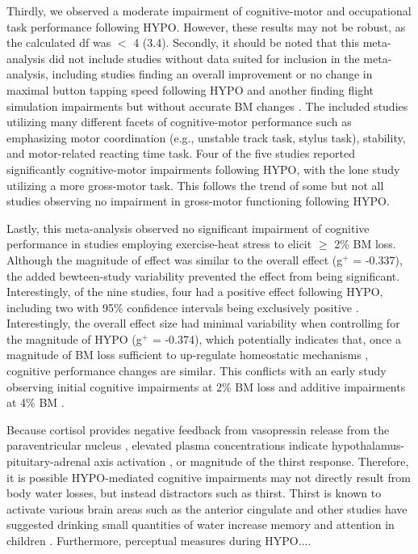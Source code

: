 Thirdly, we observed a moderate impairment of cognitive-motor and occupational task performance following HYPO. However, these results may not be robust, as the calculated df was ${<}$ 4 (3.4). Secondly, it should be noted that this meta-analysis did not include studies without data suited for inclusion in the meta-analysis, including studies finding an overall improvement \cite{bandelow_effects_2010} or no change \cite{hogervorst_cognitive_1996} in maximal button tapping speed following HYPO and another finding flight simulation impairments but without accurate BM changes \cite{lindseth_effects_2013}. The included studies utilizing many different facets of cognitive-motor performance such as emphasizing motor coordination (e.g., unstable track task, stylus task), stability, and motor-related reacting time task. Four of the five studies reported significantly cognitive-motor impairments following HYPO, with the lone study utilizing a more gross-motor task. This follows the trend of some \cite{savoie_effect_2015} but not all \cite{baker_progressive_2007} studies observing no impairment in gross-motor functioning following HYPO. 

Lastly, this meta-analysis observed no significant impairment of cognitive performance in studies employing exercise-heat stress to elicit ${\ge}$ 2\% BM loss. Although the magnitude of effect was similar to the overall effect (g${^+}$ = -0.337), the added bewteen-study variability prevented the effect from being significant. Interestingly, of the nine studies, four had a positive effect following HYPO, including two with 95\% confidence intervals being exclusively positive \cite{danci_voluntary_2009,bijlani_effect_1980}. Interestingly, the overall effect size had minimal variability when controlling for the magnitude of HYPO (g${^+}$ = -0.374), which potentially indicates that, once a magnitude of BM loss sufficient to up-regulate homeostatic mechanisms  \cite{sawka_american_2007,cheuvront_dehydration:_2014}, cognitive performance changes are similar. This conflicts with an early study observing initial cognitive impairments at 2\% BM loss and additive impairments at 4\% BM \cite{gopinathan_role_1988}.  

Because cortisol provides negative feedback from vasopressin release from the paraventricular nucleus \cite{andreoli_endocrine_2010}, elevated plasma concentrations indicate hypothalamus-pituitary-adrenal axis activation \cite{lieberman_severe_2005}, or magnitude of the thirst response. Therefore, it is possible HYPO-mediated cognitive impairments may not directly result from body water losses, but instead distractors such as thirst. Thirst is known to activate various brain areas such as the anterior cingulate \cite{saker_regional_2014} and other studies have suggested drinking small quantities of water increase memory and attention in children \cite{benton_effect_2009}. Furthermore, perceptual measures during HYPO....


 